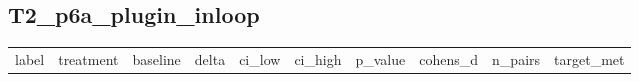 \subsection*{T2\_p6a\_plugin\_inloop}
{\def\LTcaptype{none} %
\begin{longtable}[]{@{}
  >{\raggedright\arraybackslash}p{}
  >{\raggedright\arraybackslash}p{}
  >{\raggedright\arraybackslash}p{}
  >{\raggedright\arraybackslash}p{}
  >{\raggedright\arraybackslash}p{}
  >{\raggedright\arraybackslash}p{}
  >{\raggedright\arraybackslash}p{}
  >{\raggedright\arraybackslash}p{}
  >{\raggedright\arraybackslash}p{}
  >{\raggedright\arraybackslash}p{}@{}}
\toprule\noalign{}
\begin{minipage}[b]{\linewidth}\raggedright
label
\end{minipage} & \begin{minipage}[b]{\linewidth}\raggedright
treatment
\end{minipage} & \begin{minipage}[b]{\linewidth}\raggedright
baseline
\end{minipage} & \begin{minipage}[b]{\linewidth}\raggedright
delta
\end{minipage} & \begin{minipage}[b]{\linewidth}\raggedright
ci\_low
\end{minipage} & \begin{minipage}[b]{\linewidth}\raggedright
ci\_high
\end{minipage} & \begin{minipage}[b]{\linewidth}\raggedright
p\_value
\end{minipage} & \begin{minipage}[b]{\linewidth}\raggedright
cohens\_d
\end{minipage} & \begin{minipage}[b]{\linewidth}\raggedright
n\_pairs
\end{minipage} & \begin{minipage}[b]{\linewidth}\raggedright
target\_met
\end{minipage} \\

\end{longtable}}
